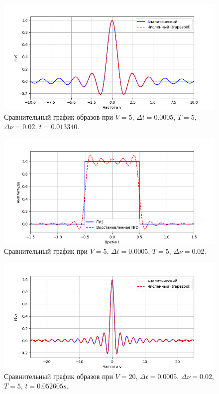 \documentclass[a4paper]{article}
\begin{document}
\begin{figure}[H]
  \centering
  \includegraphics[width=\textwidth]{src/task_1_1/freq_5_0.0005_5_0.02.png}
  \caption{Сравнительный график образов при $V=5$, $\Delta t=0.0005$, $T=5$, $\Delta \nu=0.02$, $t=0.013340 $.} 
\end{figure}
\begin{figure}[H]
  \centering
  \includegraphics[width=\textwidth]{src/task_1_1/time_5_0.0005_5_0.02.png}
  \caption{Сравнительный график при $V=5$, $\Delta t=0.0005$, $T=5$, $\Delta \nu=0.02$.}
\end{figure}
\begin{figure}[H]
  \centering
  \includegraphics[width=\textwidth]{src/task_1_1/freq_5_0.0005_20_0.02.png}
  \caption{Сравнительный график образов при $V=20$, $\Delta t=0.0005$, $\Delta \nu=0.02$, $T=5$, $t=0.052605 s$.} 
\end{figure}
\end{document}

